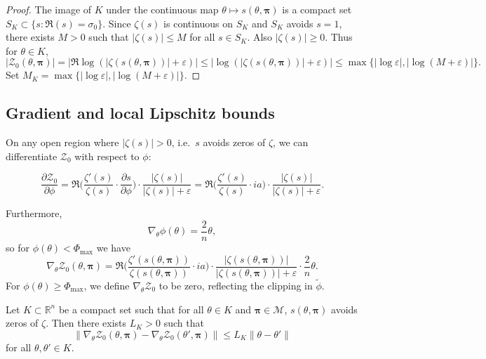\documentclass[11pt]{article}
\begin{document}
\begin{proof}
The image of $K$ under the continuous map $\theta\mapsto s(\theta,\bm{\pi})$ is a compact set $S_K\subset\{s : \Re(s)=\sigma_0\}$. Since $\zeta(s)$ is continuous on $S_K$ and $S_K$ avoids $s=1$, there exists $M>0$ such that $|\zeta(s)|\le M$ for all $s\in S_K$. Also $|\zeta(s)|\ge 0$. Thus for $\theta\in K$,
\[
  |\mathcal{Z}_0(\theta,\bm{\pi})|
  = \big|\Re\log(|\zeta(s(\theta,\bm{\pi}))|+\varepsilon)\big|
  \le \big|\log(|\zeta(s(\theta,\bm{\pi}))|+\varepsilon)\big|
  \le \max\{|\log \varepsilon|, |\log(M+\varepsilon)|\}.
\]
Set $M_K = \max\{|\log \varepsilon|, |\log(M+\varepsilon)|\}$.
\end{proof}

\subsection{Gradient and local Lipschitz bounds}

On any open region where $|\zeta(s)|>0$, i.e.\ $s$ avoids zeros of $\zeta$, we can differentiate $\mathcal{Z}_0$ with respect to $\phi$:

\[
  \frac{\partial \mathcal{Z}_0}{\partial \phi}
   = \Re\bigg(
      \frac{\zeta'(s)}{\zeta(s)}\cdot \frac{\partial s}{\partial \phi}
     \bigg)\cdot \frac{|\zeta(s)|}{|\zeta(s)|+\varepsilon}
   = \Re\bigg(
      \frac{\zeta'(s)}{\zeta(s)}\cdot i a
     \bigg)\cdot \frac{|\zeta(s)|}{|\zeta(s)|+\varepsilon}.
\]

Furthermore,
\[
  \nabla_\theta \phi(\theta) = \frac{2}{n}\theta,
\]
so for $\phi(\theta) < \Phi_{\max}$ we have
\begin{equation}
  \nabla_\theta \mathcal{Z}_0(\theta,\bm{\pi})
    = \Re\bigg(
        \frac{\zeta'(s(\theta,\bm{\pi}))}{\zeta(s(\theta,\bm{\pi}))}\cdot i a
      \bigg)\cdot \frac{|\zeta(s(\theta,\bm{\pi}))|}
                         {|\zeta(s(\theta,\bm{\pi}))|+\varepsilon}
       \cdot \frac{2}{n}\theta.
  \label{A:eq:grad_zeta_full}
\end{equation}
For $\phi(\theta)\ge\Phi_{\max}$, we define $\nabla_\theta\mathcal{Z}_0$ to be zero, reflecting the clipping in $\tilde{\phi}$.

\begin{lemma}
Let $K\subset\mathbb{R}^n$ be a compact set such that for all $\theta\in K$ and $\bm{\pi}\in\mathcal{M}$, $s(\theta,\bm{\pi})$ avoids zeros of $\zeta$. Then there exists $L_K>0$ such that
\[
  \|\nabla_\theta \mathcal{Z}_0(\theta,\bm{\pi}) -
    \nabla_\theta \mathcal{Z}_0(\theta',\bm{\pi})\|
  \le L_K\|\theta-\theta'\|
\]
for all $\theta,\theta'\in K$.
\end{lemma}
\end{document}
